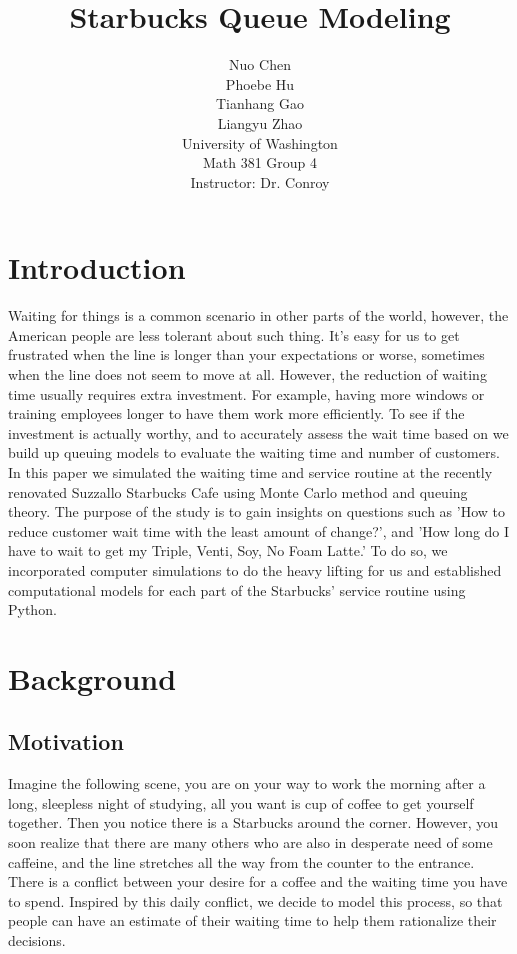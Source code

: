 \documentclass[a4paper]{article}
\title{\vspace{5cm}Starbucks Queue Modeling}
\author{Nuo Chen \\ Phoebe Hu \\
Tianhang Gao\\ Liangyu Zhao \\ [1.0 cm]
		University of Washington \\
		Math 381 Group 4 \\
        Instructor: Dr. Conroy}
\begin{document}
\begin{titlepage}
\maketitle
\end{titlepage}

{\hypersetup{linkcolor=black}
\tableofcontents
}

\newpage

\section{Introduction}
Waiting for things is a common scenario in other parts of the world, however, the American people are less tolerant about such thing. It's easy for us to get frustrated when the line is longer than your expectations or worse, sometimes when the line does not seem to move at all. However, the reduction of waiting time usually requires extra investment. For example, having more windows or training employees longer to have them work more efficiently. To see if the investment is actually worthy, and to accurately assess the wait time based on  we build up queuing models to evaluate the waiting time and number of customers. In this paper we simulated the waiting time and service routine at the recently renovated Suzzallo Starbucks Cafe using Monte Carlo method and queuing theory. The purpose of the study is to gain insights on questions such as 'How to reduce customer wait time with the least amount of change?', and 'How long do I have to wait to get my Triple, Venti, Soy, No Foam Latte.' To do so, we incorporated computer simulations to do the heavy lifting for us and established computational models for each part of the Starbucks' service routine using Python.  

\section{Background}

\subsection{Motivation}
Imagine the following scene, you are on your way to work the morning after a long, sleepless night of studying, all you want is cup of coffee to get yourself together. Then you notice there is a Starbucks around the corner. However, you soon realize that there are many others who are also in desperate need of some caffeine, and the line stretches all the way from the counter to the entrance. There is a conflict between your desire for a coffee and the waiting time you have to spend. Inspired by this daily conflict, we decide to model this process, so that people can have an estimate of their waiting time to help them rationalize their decisions. 
\end{document}
